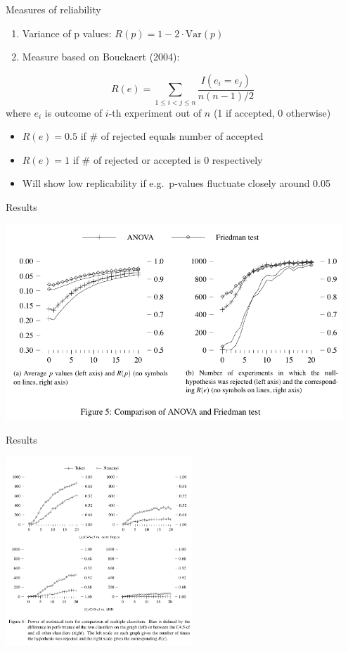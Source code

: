 \documentclass[aspectratio=169,12pt]{beamer}
\providecommand{\tightlist}{%
  \setlength{\itemsep}{2pt}\setlength{\parskip}{0pt}}
\begin{document}
\begin{frame}{Measures of reliability}
\label{measures-of-reliability}
\begin{enumerate}[<+->]
\tightlist
\item
  Variance of p values: \(R(p) = 1 - 2 \cdot \mathrm{Var}(p)\)
\item
  Measure based on Bouckaert (2004):
\end{enumerate}

\[R(e) = \sum_{1 \leq i < j \leq n} \frac{I(e_i = e_j)}{n(n-1)/2}\]
where \(e_i\) is outcome of \(i\)-th experiment out of \(n\) (1 if
accepted, 0 otherwise)

\begin{itemize}[<+->]
\tightlist
\item
  \(R(e) = 0.5\) if \# of rejected equals number of accepted
\item
  \(R(e) = 1\) if \# of rejected or accepted is 0 respectively
\item
  Will show low replicability if e.g.~p-values fluctuate closely around
  0.05
\end{itemize}
\end{frame}

\begin{frame}{Results}
\label{results}
\begin{center}
\includegraphics[width=0.95\textwidth,height=1.2\textheight]{img/fig5.png}
\end{center}
\end{frame}

\begin{frame}{Results}
\label{results-1}
\begin{center}
\includegraphics[width=2.76in,height=1\textheight]{img/fig6.png}
\end{center}
\end{frame}
\end{document}

